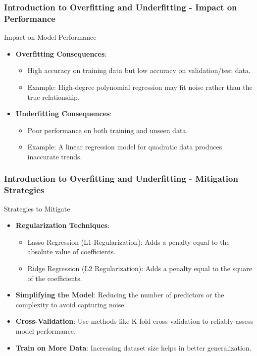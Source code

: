 \documentclass[aspectratio=169]{beamer}
\begin{document}
\begin{frame}[fragile]
    \frametitle{Introduction to Overfitting and Underfitting - Impact on Performance}
    \begin{block}{Impact on Model Performance}
        \begin{itemize}
            \item \textbf{Overfitting Consequences}:
            \begin{itemize}
                \item High accuracy on training data but low accuracy on validation/test data.
                \item Example: High-degree polynomial regression may fit noise rather than the true relationship.
            \end{itemize}
            \item \textbf{Underfitting Consequences}:
            \begin{itemize}
                \item Poor performance on both training and unseen data.
                \item Example: A linear regression model for quadratic data produces inaccurate trends.
            \end{itemize}
        \end{itemize}
    \end{block}
\end{frame}

\begin{frame}[fragile]
    \frametitle{Introduction to Overfitting and Underfitting - Mitigation Strategies}
    \begin{block}{Strategies to Mitigate}
        \begin{itemize}
            \item \textbf{Regularization Techniques}:
            \begin{itemize}
                \item Lasso Regression (L1 Regularization): Adds a penalty equal to the absolute value of coefficients.
                \item Ridge Regression (L2 Regularization): Adds a penalty equal to the square of the coefficients.
            \end{itemize}
            \item \textbf{Simplifying the Model}: Reducing the number of predictors or the complexity to avoid capturing noise.
            \item \textbf{Cross-Validation}: Use methods like K-fold cross-validation to reliably assess model performance.
            \item \textbf{Train on More Data}: Increasing dataset size helps in better generalization.
        \end{itemize}
    \end{block}
\end{frame}
\end{document}
